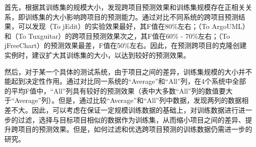 首先，根据其训练集的规模大小，发现跨项目预测效果和训练集规模存在正相关关系，即训练集的大小影响跨项目的预测能力。通过对比不同系统的跨项目预测结果，可以发现（To jEdit）的实验效果最好，其F值在80\%左右；（To ArgoUML）和（To Tuxguitar）的跨项目预测效果次之，其F值在60\% - 70\%左右；（To jFreeChart）的预测效果最差，F值在50\%左右。因此，在预测跨项目的克隆创建实例时，建议扩大其训练集的大小，以达到较好的预测效果。

然后，对于某一个具体的测试系统，由于项目之间的差异，训练集规模的大小并不能起到决定性作用。通过对比同一系统的“Average”和“All”列，在4个系统中全部的平均F值中，“All”列具有较好的预测效果（表中大多数“All”列的数值要大于“Average”列）。但是，通过比较“Average”和“All”列中数据，发现两列的数据相差不大。因此，可以考虑在保证一定规模训练数据的基础上，对训练数据进行进一步的过滤，选择与目标项目相似的数据作为训练集，从而缩小项目之间的差异、提升跨项目的预测效果。但是，如何过滤和优选跨项目预测的训练数据仍需进一步的研究。

